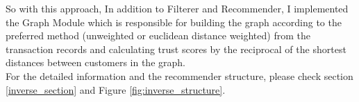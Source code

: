 So with this approach, In addition to Filterer and Recommender, I implemented the Graph Module which is responsible for building the graph according to the preferred method (unweighted or euclidean distance weighted) from the transaction records and calculating trust scores by the reciprocal of the shortest distances between customers in the graph. \\

For the detailed information and the recommender structure, please check section \ref{inverse_section} and Figure \ref{fig:inverse_structure}.